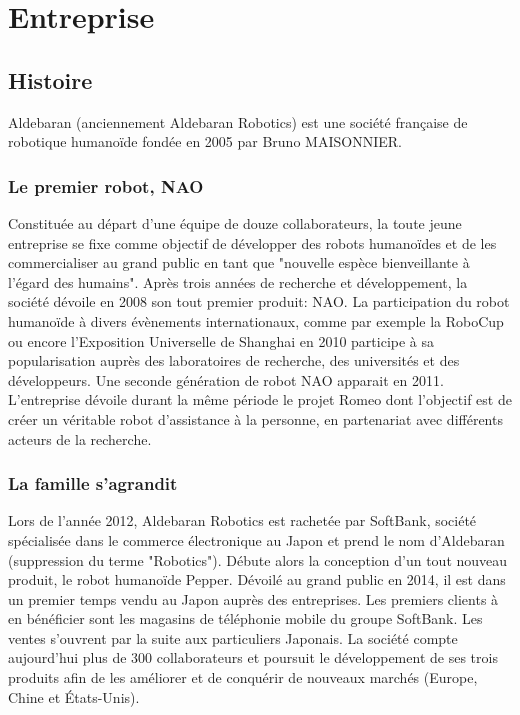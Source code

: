 \chapter{Entreprise}
\label{Entreprise}
\thispagestyle{fancy}

\section{Histoire}
\label{Entreprise: histoire}
Aldebaran (anciennement Aldebaran Robotics) est une société française de robotique humanoïde fondée en 2005 par Bruno MAISONNIER.

\subsection{Le premier robot, NAO}
\label{Entreprise:Histoire:Nao}
Constituée au départ d'une équipe de douze collaborateurs, la toute jeune entreprise se fixe comme objectif de développer des robots humanoïdes et de les commercialiser au grand public en tant que "nouvelle espèce bienveillante à l'égard des humains". Après trois années de recherche et développement, la société dévoile en 2008 son tout premier produit: NAO. La participation du robot humanoïde à divers évènements internationaux, comme par exemple la RoboCup ou encore l'Exposition Universelle de Shanghai en 2010 participe à sa popularisation auprès des laboratoires de recherche, des universités et des développeurs. Une seconde génération de robot NAO apparait en 2011. L'entreprise dévoile durant la même période le projet Romeo dont l'objectif est de créer un véritable robot d'assistance à la personne, en partenariat avec différents acteurs de la recherche.

\subsection{La famille s'agrandit}
\label{Entreprise: La famille Aldebaran}
Lors de l'année 2012, Aldebaran Robotics est rachetée par SoftBank, société spécialisée dans le commerce électronique au Japon et prend le nom d'Aldebaran (suppression du terme "Robotics"). Débute alors la conception d'un tout nouveau produit, le robot humanoïde Pepper. Dévoilé au grand public en 2014, il est dans un premier temps vendu au Japon auprès des entreprises. Les premiers clients à en bénéficier sont les magasins de téléphonie mobile du groupe SoftBank. Les ventes s'ouvrent par la suite aux particuliers Japonais. La société compte aujourd'hui plus de 300 collaborateurs et poursuit le développement de ses trois produits afin de les améliorer et de conquérir de nouveaux marchés (Europe, Chine et États-Unis).


